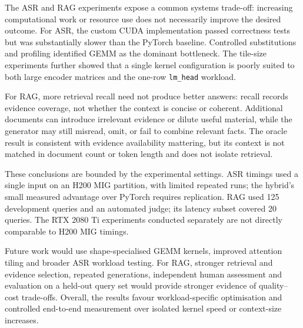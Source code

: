 The ASR and RAG experiments expose a common systems
trade-off: increasing computational work or resource
use does not necessarily improve the desired outcome.
For ASR, the custom CUDA implementation passed
correctness tests but was substantially slower than
the PyTorch baseline. Controlled substitutions and
profiling identified GEMM as the dominant bottleneck.
The tile-size experiments further showed that a
single kernel configuration is poorly suited to
both large encoder matrices and the one-row
\texttt{lm\_head} workload.

For RAG, more retrieval recall need not produce
better answers: recall records evidence coverage,
not whether the context is concise or coherent.
Additional documents can introduce irrelevant
evidence or dilute useful material, while the
generator may still misread, omit, or fail to
combine relevant facts. The oracle result is
consistent with evidence availability mattering,
but its context is not matched in document count
or token length and does not isolate retrieval.

These conclusions are bounded by the experimental
settings. ASR timings used a single input on an
H200 MIG partition, with limited repeated runs;
the hybrid's small measured advantage over
PyTorch requires replication. RAG used 125
development queries and an automated judge;
its latency subset covered 20 queries. The
RTX 2080 Ti experiments conducted separately
are not directly comparable to H200 MIG timings.

Future work would use shape-specialised GEMM
kernels, improved attention tiling and broader
ASR workload testing. For RAG, stronger
retrieval and evidence selection, repeated
generations, independent human assessment
and evaluation on a held-out query set would
provide stronger evidence of quality--cost
trade-offs. Overall, the results favour
workload-specific optimisation and controlled
end-to-end measurement over isolated kernel
speed or context-size increases.